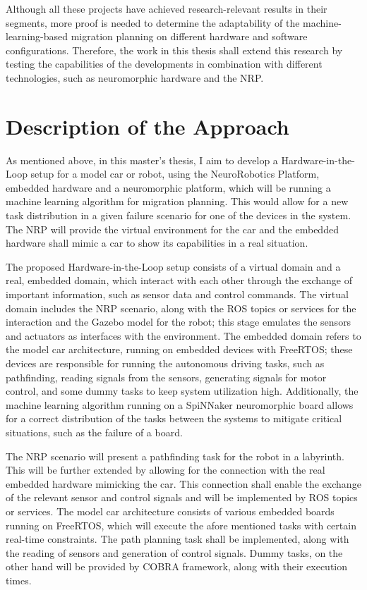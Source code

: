 Although all these projects have achieved research-relevant results in their segments, more proof is needed to determine the adaptability of the machine-learning-based migration planning on different hardware and software configurations. Therefore, the work in this thesis shall extend this research by testing the capabilities of the developments in combination with different technologies, such as neuromorphic hardware and the NRP.

\chapter{Description of the Approach}\label{chapter:descriptionapproach}
As mentioned above, in this master’s thesis, I aim to develop a Hardware-in-the-Loop setup for a model car or robot, using the NeuroRobotics Platform, embedded hardware and a neuromorphic platform, which will be running a machine learning algorithm for migration planning. This would allow for a new task distribution in a given failure scenario for one of the devices in the system. The NRP will provide the virtual environment for the car and the embedded hardware shall mimic a car to show its capabilities in a real situation.

The proposed Hardware-in-the-Loop setup consists of a virtual domain and a real, embedded domain, which interact with each other through the exchange of important information, such as sensor data and control commands. The virtual domain includes the NRP scenario, along with the ROS topics or services for the interaction and the Gazebo model for the robot; this stage emulates the sensors and actuators as interfaces with the environment. The embedded domain refers to the model car architecture, running on embedded devices with FreeRTOS; these devices are responsible for running the autonomous driving tasks, such as pathfinding, reading signals from the sensors, generating signals for motor control, and some dummy tasks to keep system utilization high. Additionally, the machine learning algorithm running on a SpiNNaker neuromorphic board allows for a correct distribution of the tasks between the systems to mitigate critical situations, such as the failure of a board.

The NRP scenario will present a pathfinding task for the robot in a labyrinth. This will be further extended by allowing for the connection with the real embedded hardware mimicking the car. This connection shall enable the exchange of the relevant sensor and control signals and will be implemented by ROS topics or services.
The model car architecture consists of various embedded boards running on FreeRTOS, which will execute the afore mentioned tasks with certain real-time constraints. The path planning task shall be implemented, along with the reading of sensors and generation of control signals. Dummy tasks, on the other hand will be provided by COBRA framework, along with their execution times. 

